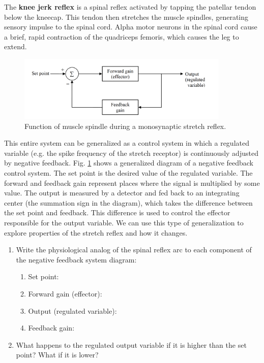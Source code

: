 \documentclass{article}
\begin{document}
The \textbf{knee jerk reflex} is a spinal reflex activated by tapping the patellar tendon below the kneecap. This tendon then stretches the muscle spindles, generating sensory impulse to the spinal cord. Alpha motor neurons in the spinal cord cause a brief, rapid contraction of the quadriceps femoris, which causes the leg to extend.\\

\begin{figure}[h]
\centering
\includegraphics[width=0.9\textwidth]{../images/EMG_II_2.png}	
\caption{Function of muscle spindle during a monosynaptic stretch reflex.}
\label{feedback}
\end{figure}

This entire system can be generalized as a control system in which a regulated variable (e.g. the spike frequency of the stretch receptor) is continuously adjusted by negative feedback. Fig. \ref{feedback} shows a generalized diagram of a negative feedback control system. The set point is the desired value of the regulated variable. The forward and feedback gain represent places where the signal is multiplied by some value. The output is measured by a detector and fed back to an integrating center (the summation sign in the diagram), which takes the difference between the set point and feedback. This difference is used to control the effector responsible for the output variable. We can use this type of generalization to explore properties of the stretch reflex and how it changes.\\

\begin{enumerate}
	\item Write the physiological analog of the spinal reflex arc to each component of the negative feedback system diagram:
	\begin{enumerate}
		\item Set point:
		\item Forward gain (effector):
		\item Output (regulated variable):
		\item Feedback gain:
	\end{enumerate}
	\item What happens to the regulated output variable if it is higher than the set point? What if it is lower?
\end{enumerate}
\end{document}

